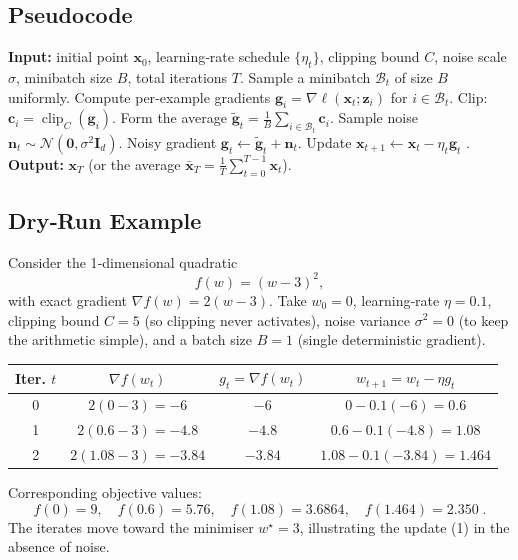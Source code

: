 \documentclass{article}
\begin{document}
\subsection*{Pseudocode}
\begin{algorithm}[H]
\caption{DP‑SGD with Gaussian Noise}
\begin{algorithmic}[1]
\State \textbf{Input:} initial point $\mathbf{x}_0$, learning‑rate schedule $\{\eta_t\}$,
clipping bound $C$, noise scale $\sigma$, minibatch size $B$, total iterations $T$.
    \State Sample a minibatch $\mathcal{B}_t$ of size $B$ uniformly.
    \State Compute per‑example gradients $\mathbf{g}_i=\nabla\ell(\mathbf{x}_t;\mathbf{z}_i)$ for $i\in\mathcal{B}_t$.
    \State Clip: $\mathbf{c}_i=\operatorname{clip}_C(\mathbf{g}_i)$.
    \State Form the average $\tilde{\mathbf{g}}_t=\frac{1}{B}\sum_{i\in\mathcal{B}_t}\mathbf{c}_i$.
    \State Sample noise $\mathbf{n}_t\sim\mathcal{N}(\mathbf{0},\sigma^2\mathbf{I}_d)$.
    \State Noisy gradient $\mathbf{g}_t\gets \tilde{\mathbf{g}}_t+\mathbf{n}_t$.
    \State Update $\mathbf{x}_{t+1}\gets \mathbf{x}_t-\eta_t\mathbf{g}_t$ .
\EndFor
\State \textbf{Output:} $\mathbf{x}_T$ (or the average $\bar{\mathbf{x}}_T=\frac1T\sum_{t=0}^{T-1}\mathbf{x}_t$).
\end{algorithmic}
\end{algorithm}

\subsection*{Dry‑Run Example}
Consider the 1‑dimensional quadratic
\[
    f(w)=(w-3)^2,
\]
with exact gradient $\nabla f(w)=2(w-3)$.  
Take $w_0=0$, learning‑rate $\eta=0.1$, clipping bound $C=5$ (so clipping never activates), noise variance $\sigma^2=0$ (to keep the arithmetic simple), and a batch size $B=1$ (single deterministic gradient).  

\begin{center}
\begin{tabular}{c|c|c|c}
\textbf{Iter.} $t$ & $\nabla f(w_t)$ & $g_t=\nabla f(w_t)$ & $w_{t+1}=w_t-\eta g_t$ \\ \midrule
0 & $2(0-3)=-6$ & $-6$ & $0-0.1(-6)=0.6$ \\
1 & $2(0.6-3)=-4.8$ & $-4.8$ & $0.6-0.1(-4.8)=1.08$ \\
2 & $2(1.08-3)=-3.84$ & $-3.84$ & $1.08-0.1(-3.84)=1.464$ 
\end{tabular}
\end{center}
Corresponding objective values:
\[
f(0)=9,\quad f(0.6)=5.76,\quad f(1.08)=3.6864,\quad f(1.464)=2.350\;.
\]
The iterates move toward the minimiser $w^\star=3$, illustrating the update (1) in the absence of noise.
\end{document}

